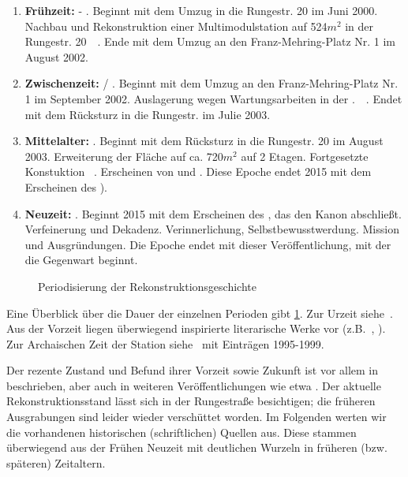 \begin{enumerate}
        \item \textbf{Frühzeit:} - . Beginnt mit dem Umzug in die Rungestr. 20 im Juni 2000.  Nachbau und Rekonstruktion einer Multimodulstation  auf 524$m^2$ in der Rungestr. 20~\cite{cbasepressemap}~\cite{cbasebook}. Ende mit dem Umzug an den Franz-Mehring-Platz Nr. 1 im August 2002.
        
        \item \textbf{Zwischenzeit:}   / .  Beginnt mit dem Umzug an den Franz-Mehring-Platz Nr. 1 im September 2002. 
        Auslagerung wegen Wartungsarbeiten in der .~\cite{cbasepressemap}~\cite{cbasebook}.  Endet mit dem Rücksturz in die Rungestr. im Julie 2003.
        
        \item \textbf{Mittelalter:}  . Beginnt mit dem Rücksturz in die Rungestr. 20 im August 2003. 
         Erweiterung der Fläche auf ca. 720$m^2$ auf 2 Etagen. Fortgesetzte Konstuktion \cite{cbasepressemap}~\cite{cbasebook}. Erscheinen von \cite{cbasestarbasemanual} und \cite{ctour}. Diese Epoche endet 2015 mit dem Erscheinen des ).
        
         \item \textbf{Neuzeit:} . Beginnt 2015 mit dem Erscheinen des , das den Kanon abschließt. Verfeinerung und Dekadenz. Verinnerlichung, Selbstbewusstwerdung. Mission und Ausgründungen. Die Epoche endet mit dieser Veröffentlichung, mit der die Gegenwart beginnt.
    \end{enumerate}


\begin{figure}
    \centering
        \resizebox{\textwidth}{!}{
        
        }
        \vspace{2ex}
    \caption{Periodisierung der Rekonstruktionsgeschichte}
    \label{fig:perioden}
\end{figure}

Eine Überblick über die Dauer der einzelnen Perioden gibt \cref{fig:perioden}. Zur Urzeit siehe~\cite{cbaselogbuchpre}. Aus der Vorzeit liegen überwiegend inspirierte literarische Werke vor (z.B.~\cite{rfc968cerf}, \cite{rfc527cerf}). Zur Archaischen Zeit der Station siehe~\cite{cbaselogbuchnow} mit Einträgen 1995-1999.


Der rezente Zustand und Befund ihrer Vorzeit sowie Zukunft ist vor allem in \cite{cbasebook} beschrieben, aber auch in weiteren Veröffentlichungen wie etwa \cite{cbasewebsite}. Der aktuelle Rekonstruktionsstand lässt sich in der Rungestraße besichtigen; die früheren Ausgrabungen sind leider wieder verschüttet worden. Im Folgenden werten wir die vorhandenen historischen (schriftlichen) Quellen  aus. Diese stammen überwiegend aus der Frühen Neuzeit mit deutlichen Wurzeln in früheren (bzw. späteren) Zeitaltern.

